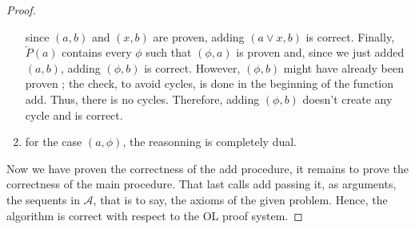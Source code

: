 \documentclass[a4paper, 11pt]{article}
\begin{document}
\begin{proof}
\begin{enumerate}
			    since $(a,b)$ and $(x,b)$ are proven, adding $(a\vee x,b)$ is correct.
			    Finally, $\overleftarrow{P}(a)$ contains every $\phi$ such that $(\phi,a)$
			    is proven and, since we just added $(a,b)$, adding $(\phi,b)$ is correct.
			    However, $(\phi,b)$ might have already been proven ; the check, to avoid
			    cycles, is done in the beginning of the function \textsf{add}. Thus, there is
			    no cycles.
			    Therefore, adding $(\phi,b)$ doesn't create any cycle and is correct.
		    \item
			    for the case $(a,\phi)$, the reasonning is completely dual.
	    \end{enumerate}
	    Now we have proven the correctness of the \textsf{add} procedure, it remains to prove the
	    correctness of the main procedure. That last calls \textsf{add} passing it,
	    as arguments, the sequents in $\mathcal{A}$, that is to say, the axioms of the given problem.
	    Hence, the algorithm is correct with respect to the OL proof system.
    \end{proof}
\end{document}
